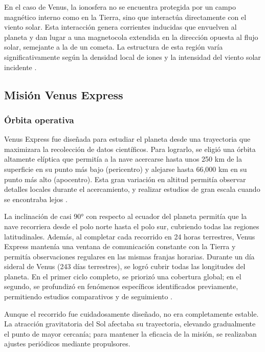 \documentclass[letterpaper,11pt]{article}
\begin{document}
                En el caso de Venus, la ionosfera no se encuentra protegida por un campo magnético interno como en la Tierra, sino que interactúa directamente con el viento solar. Esta interacción genera corrientes inducidas que envuelven al planeta y dan lugar a una magnetocola extendida en la dirección opuesta al flujo solar, semejante a la de un cometa. La estructura de esta región varía significativamente según la densidad local de iones y la intensidad del viento solar incidente \cite{nasa2025}.


        \subsection{Misión Venus Express}

            \subsubsection{Órbita operativa}

                Venus Express fue diseñada para estudiar el planeta desde una trayectoria que maximizara la recolección de datos científicos. Para lograrlo, se eligió una órbita altamente elíptica que permitía a la nave acercarse hasta unos 250 km de la superficie en su punto más bajo (pericentro) y alejarse hasta 66,000 km en su punto más alto (apocentro). Esta gran variación en altitud permitía observar detalles locales durante el acercamiento, y realizar estudios de gran escala cuando se encontraba lejos \cite{esaorbita}.

                La inclinación de casi 90° con respecto al ecuador del planeta permitía que la nave recorriera desde el polo norte hasta el polo sur, cubriendo todas las regiones latitudinales. Además, al completar cada recorrido en 24 horas terrestres, Venus Express mantenía una ventana de comunicación constante con la Tierra y permitía observaciones regulares en las mismas franjas horarias. Durante un día sideral de Venus (243 días terrestres), se logró cubrir todas las longitudes del planeta. En el primer ciclo completo, se priorizó una cobertura global; en el segundo, se profundizó en fenómenos específicos identificados previamente, permitiendo estudios comparativos y de seguimiento \cite{esaorbita}.

                Aunque el recorrido fue cuidadosamente diseñado, no era completamente estable. La atracción gravitatoria del Sol afectaba su trayectoria, elevando gradualmente el punto de mayor cercanía; para mantener la eficacia de la misión, se realizaban ajustes periódicos mediante propulsores.
            
\end{document}
